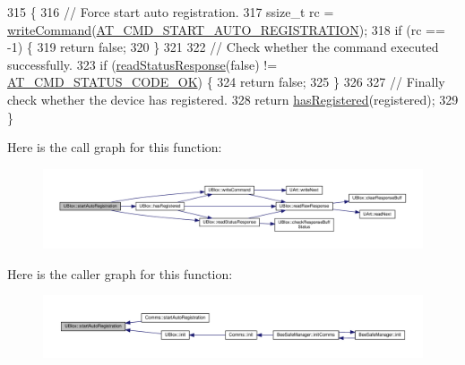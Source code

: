 \begin{DoxyCode}
315 \{
316     \textcolor{comment}{// Force start auto registration.}
317     ssize\_t rc = \hyperlink{class_u_blox_af604d1897a66192bf1c2a11997f2634d}{writeCommand}(\hyperlink{_u_blox_8cpp_a446932fdbc232c192835bf275c36ac30}{AT\_CMD\_START\_AUTO\_REGISTRATION});
318     \textcolor{keywordflow}{if} (rc == -1) \{
319         \textcolor{keywordflow}{return} \textcolor{keyword}{false};
320     \}
321 
322     \textcolor{comment}{// Check whether the command executed successfully.}
323     \textcolor{keywordflow}{if} (\hyperlink{class_u_blox_a4eaca5b1b1c4b5b6f6164b220dd43e0b}{readStatusResponse}(\textcolor{keyword}{false}) != \hyperlink{_u_blox_8cpp_a6ebc1682eb6b9964fccb4a61688ff307}{AT\_CMD\_STATUS\_CODE\_OK}) \{
324         \textcolor{keywordflow}{return} \textcolor{keyword}{false};
325     \}
326 
327     \textcolor{comment}{// Finally check whether the device has registered.}
328     \textcolor{keywordflow}{return} \hyperlink{class_u_blox_a1889c2b9bb6087bc939bd2a27b68623b}{hasRegistered}(registered);
329 \}
\end{DoxyCode}
Here is the call graph for this function\+:
\nopagebreak
\begin{figure}[H]
\begin{center}
\leavevmode
\includegraphics[width=350pt]{da/df6/class_u_blox_a2e816e864ebf43743b3f6187e20c2b1f_cgraph}
\end{center}
\end{figure}
Here is the caller graph for this function\+:
\nopagebreak
\begin{figure}[H]
\begin{center}
\leavevmode
\includegraphics[width=350pt]{da/df6/class_u_blox_a2e816e864ebf43743b3f6187e20c2b1f_icgraph}
\end{center}
\end{figure}
\mbox{\label{class_u_blox_af604d1897a66192bf1c2a11997f2634d}} 
